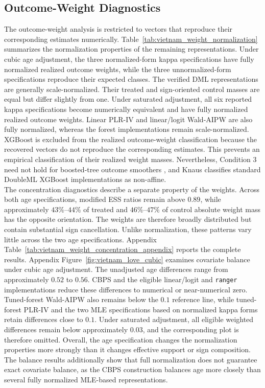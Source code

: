\documentclass[12pt, a4paper, oneside]{article}
\theoremstyle{plain}
\theoremstyle{definition}
\begin{document}
\subsection{Outcome-Weight Diagnostics}
\label{subsec:vietnam_weights}
The outcome-weight analysis is restricted to vectors that reproduce their corresponding estimates numerically. 
Table~\ref{tab:vietnam_weight_normalization} summarizes the normalization properties of the remaining representations. Under cubic age adjustment, the three normalized-form kappa specifications have fully normalized realized outcome weights, while the three unnormalized-form specifications reproduce their expected classes. The verified DML representations are generally scale-normalized.
Their treated and sign-oriented control masses are equal but differ slightly from one. Under saturated adjustment, all six reported kappa specifications become numerically equivalent and have fully normalized realized outcome weights. Linear PLR-IV and linear/logit Wald-AIPW are also fully normalized, whereas the forest implementations remain scale-normalized.
XGBoost is excluded from the realized outcome-weight classification because the recovered vectors do not reproduce the corresponding estimates. This prevents an empirical classification of their realized weight masses. Nevertheless, Condition 3 need not hold for boosted-tree outcome smoothers \citep{knaus2024treatment,curth2024randomforests}, and Knaus classifies standard DoubleML XGBoost implementations as non-affine. 
\\
The concentration diagnostics describe a separate property of the weights. Across both age specifications, modified ESS ratios remain above \(0.89\), while approximately \(43\%\)–\(44\%\) of treated and \(46\%\)–\(47\%\) of control absolute weight mass has the opposite orientation. The weights are therefore broadly distributed but contain substantial sign cancellation. Unlike normalization, these patterns vary little across the two age specifications. Appendix Table~\ref{tab:vietnam_weight_concentration_appendix} reports the complete results.
Appendix Figure~\ref{fig:vietnam_love_cubic} examines covariate balance under cubic age adjustment. The unadjusted age differences range from approximately \(0.52\) to \(0.56\). CBPS and the eligible linear/logit and \texttt{ranger} implementations reduce these differences to numerical or near-numerical zero. Tuned-forest Wald-AIPW also remains below the \(0.1\) reference line, while tuned-forest PLR-IV and the two MLE specifications based on normalized kappa forms retain differences close to \(0.1\). Under saturated adjustment, all eligible weighted differences remain below approximately \(0.03\), and the corresponding plot is therefore omitted.
Overall, the age specification changes the normalization properties more strongly than it changes effective support or sign composition. The balance results additionally show that full normalization does not guarantee exact covariate balance, as the CBPS construction balances age more closely than several fully normalized MLE-based representations.
\end{document}
